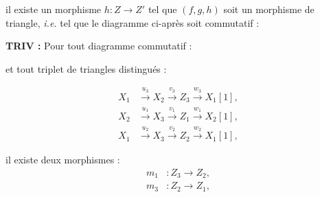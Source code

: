 %
\begingroup
\small
\setlength{\abovedisplayskip}{4pt plus 2pt minus 2pt}%
\setlength{\belowdisplayskip}{4pt plus 2pt minus 2pt}%

\noindent il existe un morphisme $h\colon Z\longrightarrow Z'$ tel que
$(f,g,h)$ soit un morphisme de triangle, \emph{i.e.} tel que le diagramme
ci-après soit commutatif :

\begin{center}
\end{center}
\pagebreak[4]

\noindent\textbf{TRIV :}
Pour tout diagramme commutatif :

\begin{center}
\end{center}
et tout triplet de triangles distingués :

\[
  \begin{aligned}
    X_1 &\xrightarrow{u_3} X_2 \xrightarrow{v_3} Z_3
        \xrightarrow{w_3} X_1[1],\\
    X_2 &\xrightarrow{u_1} X_3 \xrightarrow{v_1} Z_1
        \xrightarrow{w_1} X_2[1],\\
    X_1 &\xrightarrow{u_2} X_3 \xrightarrow{v_2} Z_2
        \xrightarrow{w_2} X_1[1],
  \end{aligned}
\]

il existe deux morphismes :
\[
  \begin{aligned}
    m_1 &\colon Z_3\longrightarrow Z_2,\\
    m_3 &\colon Z_2\longrightarrow Z_1,
  \end{aligned}
\]

